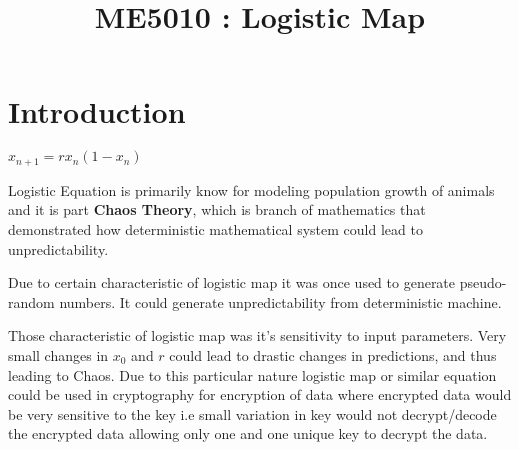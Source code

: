 \documentclass{report}
\title{\textbf{ME5010 : Logistic Map}}
\begin{document}
\maketitle

\section{Introduction}

\begin{center}$x_{n+1} = rx_n(1-x_n)$\end{center}
Logistic Equation is primarily know for modeling population growth of animals and it is part \textbf{Chaos Theory}, which is branch of mathematics that demonstrated how deterministic mathematical system could lead to unpredictability.

Due to certain characteristic of logistic map it was once used to generate pseudo-random numbers. It could generate unpredictability from deterministic machine.

Those characteristic of logistic map was it's sensitivity to input parameters. Very small changes in $x_0$ and $r$ could lead to drastic changes in predictions, and thus leading to Chaos. Due to this particular nature logistic map or similar equation could  be used in cryptography for encryption of data where encrypted data would be very sensitive to the key i.e small variation in key would not decrypt/decode the encrypted data allowing only one and one unique key to decrypt the data.
\end{document}
